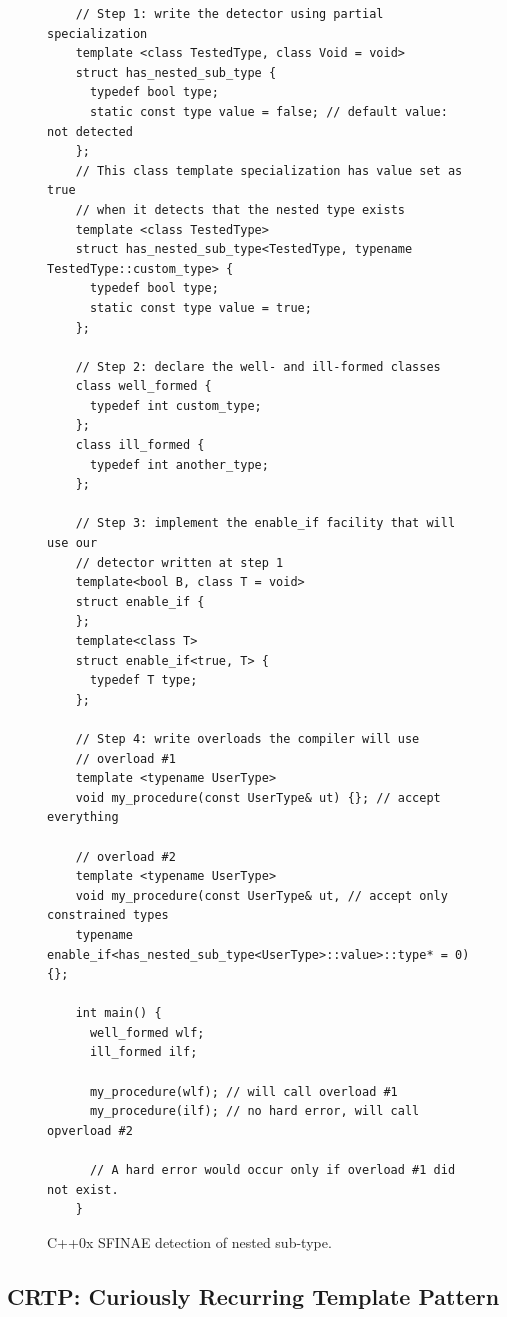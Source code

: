 \begin{figure}[tbh]
  \centering
  \begin{verbatim}
    // Step 1: write the detector using partial specialization
    template <class TestedType, class Void = void>
    struct has_nested_sub_type {
      typedef bool type;
      static const type value = false; // default value: not detected
    };
    // This class template specialization has value set as true
    // when it detects that the nested type exists
    template <class TestedType>
    struct has_nested_sub_type<TestedType, typename TestedType::custom_type> {
      typedef bool type;
      static const type value = true;
    };

    // Step 2: declare the well- and ill-formed classes
    class well_formed {
      typedef int custom_type;
    };
    class ill_formed {
      typedef int another_type;
    };

    // Step 3: implement the enable_if facility that will use our
    // detector written at step 1
    template<bool B, class T = void>
    struct enable_if {
    };
    template<class T>
    struct enable_if<true, T> {
      typedef T type;
    };

    // Step 4: write overloads the compiler will use
    // overload #1
    template <typename UserType>
    void my_procedure(const UserType& ut) {}; // accept everything

    // overload #2
    template <typename UserType>
    void my_procedure(const UserType& ut, // accept only constrained types
    typename enable_if<has_nested_sub_type<UserType>::value>::type* = 0) {};

    int main() {
      well_formed wlf;
      ill_formed ilf;

      my_procedure(wlf); // will call overload #1
      my_procedure(ilf); // no hard error, will call opverload #2

      // A hard error would occur only if overload #1 did not exist.
    }
  \end{verbatim}
  \caption{C++0x SFINAE detection of nested sub-type.}
  \label{fig.gen.sfinae.nested}
\end{figure}

\subsection{CRTP: Curiously Recurring Template Pattern}
\label{genericity.language.precpp11.sebsec.crtp}

